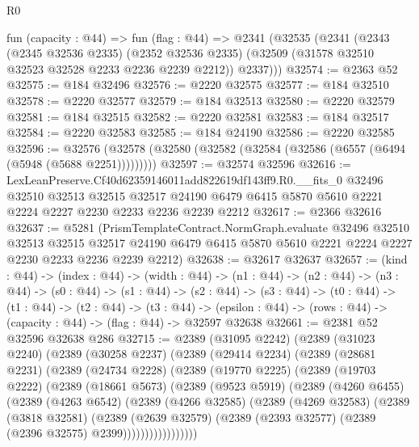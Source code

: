 \begin{lexlean}{R0}
\begin{coremodule}
  fun (capacity : @44) =>
  fun (flag : @44) =>
  @2341
    (@32535
      (@2341
        (@2343
          (@2345 @32536 @2335)
          (@2352 @32536 @2335)
          (@32509 (@31578 @32510 @32523 @32528 @2233 @2236 @2239 @2212))
          @2337)))
@32574 := @2363 @52
@32575 := @184 @32496
@32576 := @2220 @32575
@32577 := @184 @32510
@32578 := @2220 @32577
@32579 := @184 @32513
@32580 := @2220 @32579
@32581 := @184 @32515
@32582 := @2220 @32581
@32583 := @184 @32517
@32584 := @2220 @32583
@32585 := @184 @24190
@32586 := @2220 @32585
@32596 := @32576 (@32578 (@32580 (@32582 (@32584 (@32586 (@6557 (@6494 (@5948 (@5688 @2251)))))))))
@32597 := @32574 @32596
@32616 := LexLeanPreserve.Cf40d62359146011add822619df143ff9.R0.__fits_0
    @32496
    @32510
    @32513
    @32515
    @32517
    @24190
    @6479
    @6415
    @5870
    @5610
    @2221
    @2224
    @2227
    @2230
    @2233
    @2236
    @2239
    @2212
@32617 := @2366 @32616
@32637 := @5281
    (PrismTemplateContract.NormGraph.evaluate
      @32496
      @32510
      @32513
      @32515
      @32517
      @24190
      @6479
      @6415
      @5870
      @5610
      @2221
      @2224
      @2227
      @2230
      @2233
      @2236
      @2239
      @2212)
@32638 := @32617 @32637
@32657 := (kind : @44) ->
  (index : @44) ->
  (width : @44) ->
  (n1 : @44) ->
  (n2 : @44) ->
  (n3 : @44) ->
  (s0 : @44) ->
  (s1 : @44) ->
  (s2 : @44) ->
  (s3 : @44) ->
  (t0 : @44) ->
  (t1 : @44) ->
  (t2 : @44) ->
  (t3 : @44) -> (epsilon : @44) -> (rows : @44) -> (capacity : @44) -> (flag : @44) -> @32597 @32638
@32661 := @2381 @52 @32596 @32638 @286
@32715 := @2389
    (@31095 @2242)
    (@2389
      (@31023 @2240)
      (@2389
        (@30258 @2237)
        (@2389
          (@29414 @2234)
          (@2389
            (@28681 @2231)
            (@2389
              (@24734 @2228)
              (@2389
                (@19770 @2225)
                (@2389
                  (@19703 @2222)
                  (@2389
                    (@18661 @5673)
                    (@2389
                      (@9523 @5919)
                      (@2389
                        (@4260 @6455)
                        (@2389
                          (@4263 @6542)
                          (@2389
                            (@4266 @32585)
                            (@2389
                              (@4269 @32583)
                              (@2389
                                (@3818 @32581)
                                (@2389
                                  (@2639 @32579)
                                  (@2389 (@2393 @32577) (@2389 (@2396 @32575) @2399)))))))))))))))))

\end{coremodule}
\end{lexlean}
